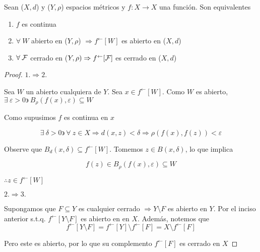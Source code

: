 \begin{theorem} \label{theom227}
    Sean ($X,d$) y ($Y,\rho$) espacios métricos y $f: X \to X$ una función. Son equivalentes

    \begin{enumerate}
        \item $f$ es continua
        \item $\forall \: W$ abierto en ($Y, \rho$) $\Rightarrow {f}^{\leftarrow}[W]$ es abierto en ($X,d$)
        \item $\forall \: \mathcal{F}$ cerrado en ($Y, \rho) \Rightarrow {f}^{\leftarrow}[\mathcal{F}]$ es cerrado en ($X,d$)
    \end{enumerate}
\end{theorem}

\begin{proof}
    $1. \Rightarrow 2.$

    Sea $W$ un abierto cualquiera de $Y$. Sea $x \in {f}^{\leftarrow}[W]$. Como $W$ es abierto, $\exists \: \varepsilon > 0 \backepsilon \: {B}_{\rho}(f(x),\varepsilon) \subseteq W$

    Como supusimos $f$ es continua en $x$
    
    $$\exists \: \delta > 0 \backepsilon \: \forall \: z \in X \Rightarrow d(x,z) < \delta \Rightarrow \rho(f(x),f(z)) < \varepsilon$$ 
    
    Observe que $B_d(x, \delta) \subseteq {f}^{\leftarrow}[W]$. Tomemos $z \in B(x,\delta)$, lo que implica 

    \begin{equation*}
        f(z) \in B_\rho(f(x), \varepsilon) \subseteq W
    \end{equation*}

    $\therefore z \in {f}^{\leftarrow}[W]$
    \smallskip \smallskip \smallskip

    $2. \Rightarrow 3.$

    Supongamos que $F \subseteq Y$ es cualquier cerrado $\Rightarrow Y \setminus F$ es abierto en $Y$. Por el inciso anterior s.t.q. ${f}^{\leftarrow}[Y \setminus F]$ es abierto en en $X$. Además, notemos que
    \begin{equation*}
        {f}^{\leftarrow}[Y \setminus F] = {f}^{\leftarrow}[Y ] \setminus {f}^{\leftarrow}[F] = X \setminus {f}^{\leftarrow}[F]
    \end{equation*}

    Pero este es abierto, por lo que su complemento ${f}^{\leftarrow}[F]$ es cerrado en $X$
    \smallskip \smallskip \smallskip
    

\end{proof}
